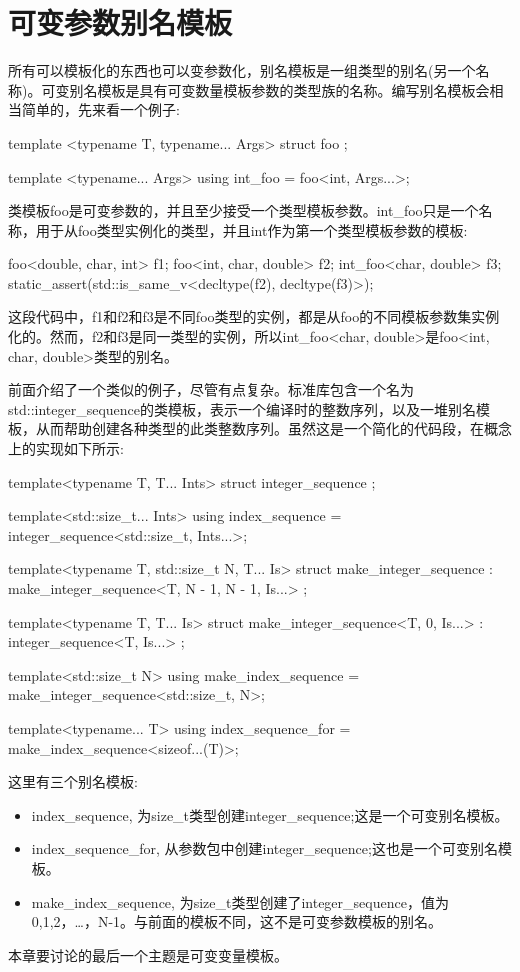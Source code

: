 \section{可变参数别名模板}
所有可以模板化的东西也可以变参数化，别名模板是一组类型的别名(另一个名称)。可变别名模板是具有可变数量模板参数的类型族的名称。编写别名模板会相当简单的，先来看一个例子:

\begin{cpp}
template <typename T, typename... Args>
struct foo
{
};

template <typename... Args>
using int_foo = foo<int, Args...>;
\end{cpp}

类模板foo是可变参数的，并且至少接受一个类型模板参数。int\_foo只是一个名称，用于从foo类型实例化的类型，并且int作为第一个类型模板参数的模板:

\begin{cpp}
foo<double, char, int> f1;
foo<int, char, double> f2;
int_foo<char, double> f3;
static_assert(std::is_same_v<decltype(f2), decltype(f3)>);
\end{cpp}

这段代码中，f1和f2和f3是不同foo类型的实例，都是从foo的不同模板参数集实例化的。然而，f2和f3是同一类型的实例，所以int\_foo<char, double>是foo<int, char, double>类型的别名。

前面介绍了一个类似的例子，尽管有点复杂。标准库包含一个名为std::integer\_sequence的类模板，表示一个编译时的整数序列，以及一堆别名模板，从而帮助创建各种类型的此类整数序列。虽然这是一个简化的代码段，在概念上的实现如下所示:

\begin{cpp}
template<typename T, T... Ints>
struct integer_sequence
{};

template<std::size_t... Ints>
using index_sequence = integer_sequence<std::size_t,
								        Ints...>;

template<typename T, std::size_t N, T... Is>
struct make_integer_sequence :
	make_integer_sequence<T, N - 1, N - 1, Is...>
{};

template<typename T, T... Is>
struct make_integer_sequence<T, 0, Is...> :
	integer_sequence<T, Is...>
{};

template<std::size_t N>
using make_index_sequence = make_integer_sequence<std::size_t,
												  N>;

template<typename... T>
using index_sequence_for =
	make_index_sequence<sizeof...(T)>;
\end{cpp}

这里有三个别名模板:

\begin{itemize}
\item
index\_sequence, 为size\_t类型创建integer\_sequence;这是一个可变别名模板。

\item
index\_sequence\_for, 从参数包中创建integer\_sequence;这也是一个可变别名模板。

\item
make\_index\_sequence, 为size\_t类型创建了integer\_sequence，值为0,1,2，…，N-1。与前面的模板不同，这不是可变参数模板的别名。
\end{itemize}

本章要讨论的最后一个主题是可变变量模板。










